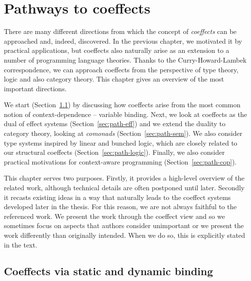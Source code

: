 \chapter{Pathways to coeffects}
\label{ch:pathways}

There are many different directions from which the concept of \emph{coeffects} can be approached
and, indeed, discovered. In the previous chapter, we motivated it by practical applications, but
coeffects also naturally arise as an extension to a number of programming language theories.
Thanks to the Curry-Howard-Lambek correspondence, we can approach coeffects from the perspective of
type theory, logic and also category theory. This chapter gives an overview of the most
important directions.

We start (Section~\ref{sec:path-binding}) by discussing how coeffects arise from the most common
notion of context-dependence -- variable binding. Next, we look at coeffects as the dual of effect
systems (Section~\ref{sec:path-eff}) and we extend the duality to category theory, looking at
\emph{comonads} (Section~\ref{sec:path-sem}). We also consider type systems inspired by linear
and bunched logic, which are closely related to our structural coeffects (Section~\ref{sec:path-logic}).
Finally, we also consider practical motivations for context-aware programming (Section~\ref{sec:path-cop}).

This chapter serves two purposes. Firstly, it provides a high-level overview of the  related work,
although technical details are often postponed until later. Secondly it recasts existing ideas in
a way that naturally leads to the coeffect systems developed later in the thesis. For this reason,
we are not always faithful to the referenced work. We present the work through the coeffect view
and so we sometimes focus on aspects that authors consider unimportant or we present the work
differently than originally intended. When we do so, this is explicitly stated in the text.


%
%

\section{Coeffects via static and dynamic binding}
\label{sec:path-binding}

